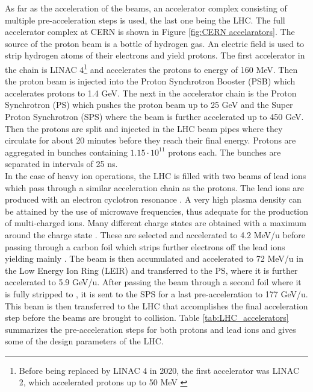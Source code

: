 \indent As far as the acceleration of the beams, an accelerator complex consisting of multiple pre-acceleration steps is used, the last one being the LHC. The full accelerator complex at CERN is shown in Figure \ref{fig:CERN accelarators}. The source of the proton beam is a bottle of hydrogen gas. An electric field is used to strip hydrogen atoms of their electrons and yield protons. The first accelerator in the chain is LINAC 4\footnote{Before being replaced by LINAC 4 in 2020, the first accelerator was LINAC 2, which accelerated protons up to 50 MeV \cite{linac}} and accelerates the protons to energy of 160 MeV. Then the proton beam is injected into the Proton Synchrotron Booster (PSB) \cite{Schindl:1997cf} which accelerates protons to 1.4 GeV. The next in the accelerator chain is the Proton Synchrotron (PS) \cite{Cappi:1997vq} which pushes the proton beam up to 25 GeV and the Super Proton Synchrotron (SPS) \cite{Linnecar:1997wj} where the beam is further accelerated up to 450 GeV. Then the protons are split and injected in the LHC beam pipes where they circulate for about 20 minutes before they reach their final energy. Protons are aggregated in bunches containing $1.15 \cdot 10^{11}$ protons each. The bunches are separated in intervals of 25 ns.\\

\indent In the case of heavy ion operations, the LHC is filled with two beams of lead ions which pass through a similar acceleration chain as the protons. The lead ions are produced with an electron cyclotron resonance \cite{doi:10.1142/9789814436403_0023}. A very high plasma density can be attained by the use of microwave frequencies, thus adequate for the production of multi-charged ions. Many different charge states are obtained with a maximum around the charge state . These are selected and accelerated to 4.2 MeV/u before passing through a carbon foil which strips further electrons off the lead ions yielding mainly . The beam is then accumulated and accelerated to 72 MeV/u in the Low Energy Ion Ring (LEIR) \cite{Chanel:557588} and transferred to the PS, where it is further accelerated to 5.9 GeV/u. After passing the beam through a second foil where it is fully stripped to , it is sent to the SPS for a last pre-acceleration to 177 GeV/u. This beam is then transferred to the LHC that accomplishes the final acceleration step before the beams are brought to collision. Table \ref{tab:LHC_accelerators} summarizes the pre-acceleration steps for both protons and lead ions and gives some of the design parameters of the LHC.

